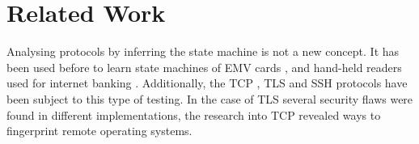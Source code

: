 \chapter{Related Work}\label{relatedwork}
\iffalse
In this chapter you demonstrate that you are sufficiently aware of the
state-of-art knowledge of the problem domain that you have investigated as
well as demonstrating that you have found a \emph{new} solution / approach / method.
\fi

Analysing protocols by inferring the state machine is not a new concept. It has been used before to learn state machines of EMV cards \cite{bankcards}, and hand-held readers used for internet banking \cite{identifier}. Additionally, the TCP \cite{tcpchecking}, TLS \cite{tlsfuzzing} and SSH \cite{sshchecking} protocols have been subject to this type of testing. In the case of TLS several security flaws were found in different implementations, the research into TCP revealed ways to fingerprint remote operating systems.